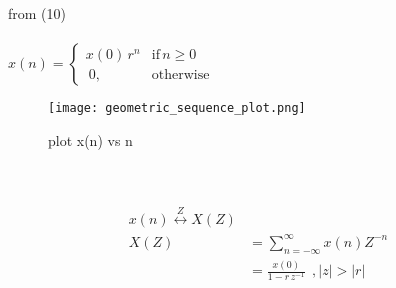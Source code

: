 \documentclass[journal,12pt,twocolumn]{IEEEtran}
\theoremstyle{remark}
\begin{document}
from (10)
\\\\$x(n)=\begin{cases} x(0)\,r^{n} &\text{if}\, n \geq 0\\\ 0,& \text{otherwise}
\end{cases}$
\begin{figure}
    \centering
	\texttt{[image: geometric\_sequence\_plot.png]}
    \caption{plot x(n) vs n}
    \label{fig:enter-label}
\end{figure}
\\\\\begin{align}x(n)\overset{Z}{\longleftrightarrow}   X(Z)
\\X(Z)&=\sum_{n=-\infty}^{\infty}x(n) Z^{-n}\
     \\ &= \frac{x(0)}{1-r\,z^{-1}}\: \:,|z|>|r| \end{align}   
\end{document}
